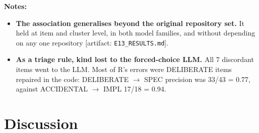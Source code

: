 \documentclass[acmsmall,screen,review,anonymous]{acmart}
\newcommand{\artifact}[1]{{\footnotesize [artifact: #1]}}
\begin{document}
\textbf{Notes:}
\begin{itemize}
\item \textbf{The association generalises beyond the original repository set.} It held at item and cluster level, in both model families, and without depending on any one repository \artifact{\texttt{E13\_RESULTS.md}}.
\item \textbf{As a triage rule, kind lost to the forced-choice LLM.} All 7 discordant items went to the LLM. Most of R's errors were DELIBERATE items repaired in the code: DELIBERATE $\rightarrow$ SPEC precision was 33/43 = 0.77, against ACCIDENTAL $\rightarrow$ IMPL 17/18 = 0.94.
\end{itemize}

\section{Discussion}
\end{document}
